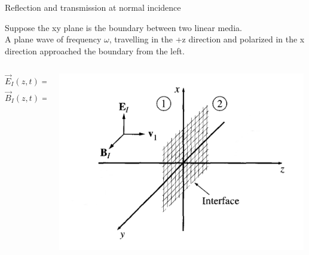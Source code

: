 %
%
%

\begin{frame}{Reflection and transmission at normal incidence}

Suppose the xy plane is the boundary between two linear media.\\
\vspace{0.2cm}
A plane wave of frequency $\omega$, travelling in the +z direction and
polarized in the x direction approached the boundary from the left.

\begin{columns}
  \begin{column}{0.40\textwidth}
  {\Large
   \begin{equation*}
        \vec{E}_I (z,t) = {E_I}_0  e^{i (k_1 z-\omega t)}  \hat{x}
   \end{equation*}
   \vspace{0.3cm}
   \begin{equation*}
         \vec{B}_I (z,t) = \frac{{E_I}_0}{u_1}  e^{i (k_1 z-\omega t)} \hat{y}
    \end{equation*}
  }
  \end{column}
  \begin{column}{0.60\textwidth}
    \begin{center}
      \includegraphics[width=0.99\textwidth]{./images/schematics/wave_reflection_transmission_normal_incidence_1.png}\\
    \end{center}
  \end{column}
\end{columns}

\end{frame}

